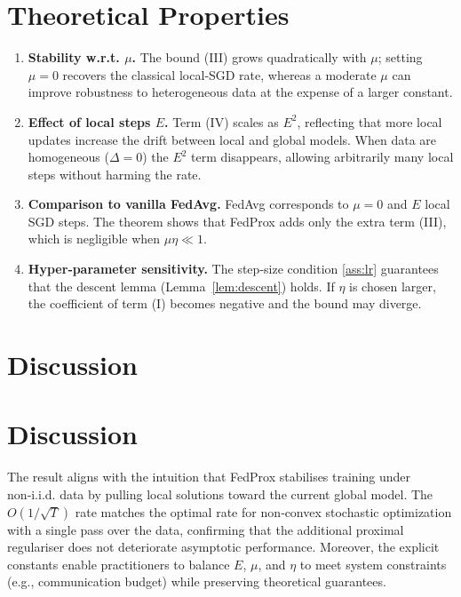 \documentclass{article}
\begin{document}
\section{Theoretical Properties}
\begin{enumerate}[label=\arabic*)]
\item \textbf{Stability w.r.t. $\mu$.}
    The bound (III) grows quadratically with $\mu$; setting $\mu=0$
    recovers the classical local‑SGD rate, whereas a moderate $\mu$ can
    improve robustness to heterogeneous data at the expense of a larger
    constant.

\item \textbf{Effect of local steps $E$.}
    Term (IV) scales as $E^{2}$, reflecting that more local updates
    increase the drift between local and global models.  When data are
    homogeneous ($\Delta=0$) the $E^{2}$ term disappears, allowing arbitrarily
    many local steps without harming the rate.

\item \textbf{Comparison to vanilla FedAvg.}
    FedAvg corresponds to $\mu=0$ and $E$ local SGD steps.
    The theorem shows that FedProx adds only the extra term (III),
    which is negligible when $\mu\eta\ll 1$.

\item \textbf{Hyper‑parameter sensitivity.}
    The step‑size condition \ref{ass:lr} guarantees that the descent
    lemma (Lemma~\ref{lem:descent}) holds.  If $\eta$ is chosen larger,
    the coefficient of term (I) becomes negative and the bound may
    diverge.
\end{enumerate}

\section*{Discussion}
\section{Discussion}
The result aligns with the intuition that FedProx stabilises training under
non‑i.i.d. data by pulling local solutions toward the current global model.
The $O(1/\sqrt{T})$ rate matches the optimal rate for non‑convex stochastic
optimization with a single pass over the data, confirming that the
additional proximal regulariser does not deteriorate asymptotic
performance.  Moreover, the explicit constants enable practitioners to
balance $E$, $\mu$, and $\eta$ to meet system constraints (e.g., communication
budget) while preserving theoretical guarantees.
\end{document}
